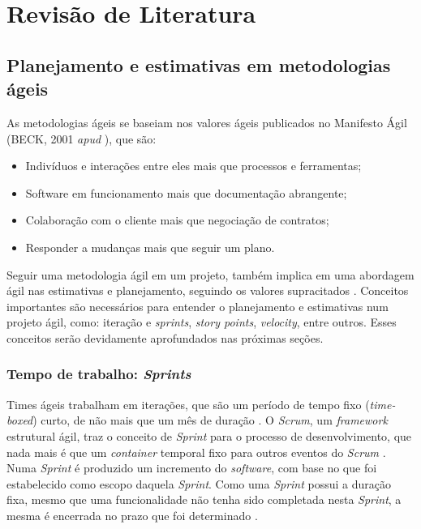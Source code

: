 \chapter{Revisão de Literatura}

\section{Planejamento e estimativas em metodologias ágeis}

  As metodologias ágeis se baseiam nos valores ágeis publicados no Manifesto Ágil
  (BECK, 2001 \textit{apud} ), que são:

  \begin{itemize}
   \item Indivíduos e interações entre eles mais que processos e ferramentas;
   \item Software em funcionamento mais que documentação abrangente;
   \item Colaboração com o cliente mais que negociação de contratos;
   \item Responder a mudanças mais que seguir um plano.
  \end{itemize}

 Seguir uma metodologia ágil em um projeto, também implica em uma abordagem ágil nas estimativas e planejamento, seguindo
 os valores supracitados \cite{cohn06}. Conceitos importantes são necessários para entender o planejamento e estimativas
 num projeto ágil, como: iteração e \textit{sprints}, \textit{story points}, \textit{velocity}, entre outros.
 Esses conceitos serão devidamente aprofundados nas próximas seções.

  \subsection{Tempo de trabalho: \textit{Sprints}}

    Times ágeis trabalham em iterações, que são um período de tempo fixo (\textit{time-boxed}) curto, de não mais que
    um mês de duração \cite{cohn06} \cite{scrum13}. O \textit{Scrum}, um \textit{framework} estrutural ágil,
    traz o conceito de \textit{Sprint} para o processo de desenvolvimento, que nada mais é que um \textit{container}
    temporal fixo para outros eventos do \textit{Scrum} \cite{scrum13}. Numa \textit{Sprint} é produzido um incremento
    do \textit{software}, com base no que foi estabelecido como escopo daquela \textit{Sprint}. Como uma \textit{Sprint} possui
    a duração fixa, mesmo que uma funcionalidade não tenha sido completada nesta \textit{Sprint}, a mesma é encerrada no prazo
    que foi determinado \cite{cohn06}.

